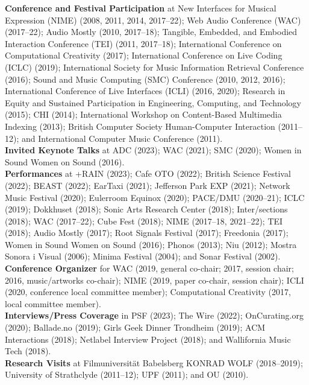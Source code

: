 \documentclass[10pt, a4paper]{article}
\begin{document}
{\textbf{Conference and Festival Participation}} at New Interfaces for Musical Expression (NIME) (2008, 2011, 2014, 2017--22); Web Audio Conference (WAC) (2017--22); Audio Mostly (2010, 2017--18); Tangible, Embedded, and Embodied Interaction Conference (TEI) (2011, 2017--18); International Conference on Computational Creativity (2017); International Conference on Live Coding (ICLC) (2019); International Society for Music Information Retrieval Conference (2016); Sound and Music Computing (SMC) Conference (2010, 2012, 2016); International Conference of Live Interfaces (ICLI) (2016, 2020); Research in Equity and Sustained Participation in Engineering, Computing, and Technology (2015); CHI (2014); International Workshop on Content-Based Multimedia Indexing (2013); British Computer Society Human-Computer Interaction (2011--12); and International Computer Music Conference (2011).\\

{\textbf{Invited Keynote Talks}} at ADC (2023); WAC (2021); SMC (2020); Women in Sound Women on Sound (2016).\\

{\textbf{Performances}} at +RAIN (2023); Cafe OTO (2022); British Science Festival (2022); BEAST (2022); EarTaxi (2021); Jefferson Park EXP (2021); Network Music Festival (2020); Eulerroom Equinox (2020); PACE/DMU (2020--21); ICLC (2019); Dokkhuset (2018); Sonic Arts Research Center (2018); Inter/sections (2018); WAC (2017--22); Cube Fest (2018); NIME (2017--18, 2021--22); TEI  (2018); Audio Mostly (2017); Root Signals Festival (2017); Freedonia (2017); Women in Sound Women on Sound (2016); Phonos (2013); Niu (2012); Mostra Sonora i Visual (2006); Minima Festival (2004); and Sonar Festival (2002).\\

{\textbf{Conference Organizer}} for WAC (2019, general co-chair; 2017, session chair; 2016, music/artworks co-chair); NIME (2019, paper co-chair, session chair); ICLI (2020, conference local committee member); Computational Creativity (2017, local committee member).\\

{\textbf{Interviews/Press Coverage}} in PSF (2023); The Wire (2022); OnCurating.org (2020); Ballade.no (2019); Girls Geek Dinner Trondheim (2019); ACM Interactions (2018); Netlabel Interview Project (2018); and Wallifornia Music Tech (2018).\\

{\textbf{Research Visits}} at Filmuniversität Babelsberg KONRAD WOLF (2018--2019); University of Strathclyde (2011--12); UPF (2011); and OU (2010).\\
\end{document}
